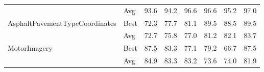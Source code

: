 \begin{table}[t]
\begin{tabular}{llcccccc}
                                       & Avg  & 93.6&	94.2&	96.6&	96.6&	95.2&	97.0\\
         \multirow{2}{*}{AsphaltPavementTypeCoordinates} & Best & 72.3&	77.7&	81.1&	89.5&	88.5&	89.5\\
                                   & Avg  & 72.7&	75.8&	77.0&	81.2&	82.1&	83.7\\
         \multirow{2}{*}{MotorImagery} & Best & 87.5&	83.3&	77.1&	79.2&	66.7&	87.5\\
                                       & Avg  & 84.9&	83.3&	83.2&	73.6&	74.0&	81.9\\
         \bottomrule
    \end{tabular}
\end{table}